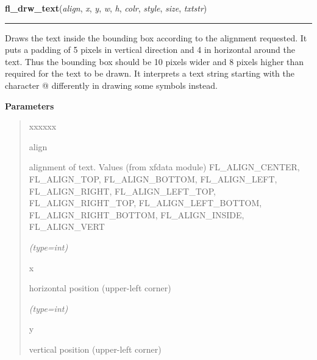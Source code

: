     \label{xformslib:flbasic:fl_drw_text}

    \vspace{0.5ex}

\hspace{.8\funcindent}\begin{boxedminipage}{\funcwidth}

    \raggedright \textbf{fl\_drw\_text}(\textit{align}, \textit{x}, \textit{y}, \textit{w}, \textit{h}, \textit{colr}, \textit{style}, \textit{size}, \textit{txtstr})

    \vspace{-1.5ex}

    \rule{\textwidth}{0.5\fboxrule}
\setlength{\parskip}{2ex}
    Draws the text inside the bounding box according to the alignment 
    requested. It puts a padding of 5 pixels in vertical direction and 4 in
    horizontal around the text. Thus the bounding box should be 10 pixels 
    wider and 8 pixels higher than required for the text to be drawn. It 
    interprets a text string starting with the character @ differently in 
    drawing some symbols instead.

\setlength{\parskip}{1ex}
      \textbf{Parameters}
      \vspace{-1ex}

      \begin{quote}
        \begin{Ventry}{xxxxxx}

          \item[align]

          alignment of text. Values (from xfdata module) FL\_ALIGN\_CENTER,
          FL\_ALIGN\_TOP, FL\_ALIGN\_BOTTOM, FL\_ALIGN\_LEFT, 
          FL\_ALIGN\_RIGHT, FL\_ALIGN\_LEFT\_TOP, FL\_ALIGN\_RIGHT\_TOP, 
          FL\_ALIGN\_LEFT\_BOTTOM, FL\_ALIGN\_RIGHT\_BOTTOM, 
          FL\_ALIGN\_INSIDE, FL\_ALIGN\_VERT

            {\it (type=int)}

          \item[x]

          horizontal position (upper-left corner)

            {\it (type=int)}

          \item[y]

          vertical position (upper-left corner)


\end{Ventry}
\end{quote}
\end{boxedminipage}
